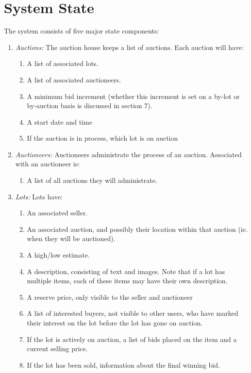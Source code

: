 \documentclass[titlepage, 12pt]{extarticle}
\begin{document}
\section{System State}
The system consists of five major state components:
\begin{enumerate}
\item {\it Auctions:} The auction house keeps a list of auctions. Each auction will have:
  \begin{enumerate}
  \item A list of associated lots.
  \item A list of associated auctioneers.
  \item A minimum bid increment (whether this increment is set on a by-lot or by-auction basis is discussed in section 7).
  \item A start date and time
  \item If the auction is in process, which lot is on auction
  \end{enumerate} 
\item {\it Auctioneers:} Auctioneers administrate the process of an auction. Associated with an auctioneer is:
  \begin{enumerate}
    \item A list of all auctions they will administrate.
  \end{enumerate}
\item {\it Lots:} Lots have:
  \begin{enumerate}
    \item An associated seller.
    \item An associated auction, and possibly their location within that auction (ie. when they will be auctioned).
    \item A high/low estimate.
    \item A description, consisting of text and images. Note that if a lot has multiple items, each of these items may have their own description.
    \item A reserve price, only visible to the seller and auctioneer
    \item A list of interested buyers, not visible to other users, who have marked their interest on the lot before the lot has gone on auction.
    \item If the lot is actively on auction, a list of bids placed on the item and a current selling price.
    \item If the lot has been sold, information about the final winning bid.
    \end{enumerate}


\end{enumerate}
\end{document}
